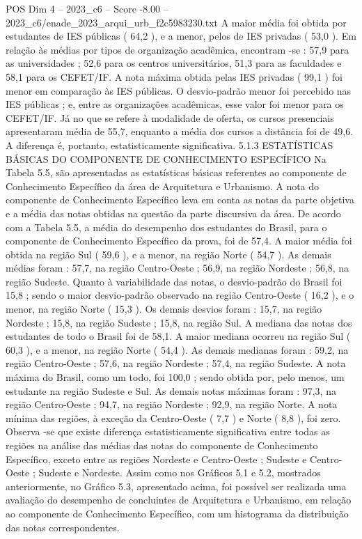 \begin{textsample}{POS Dim 4 – 2023\_c6 – Score -8.00 – 2023\_c6/enade\_2023\_arqui\_urb\_f2c5983230.txt}
A maior média foi obtida por estudantes de IES públicas ( 64,2 ), e a menor, pelos de IES privadas ( 53,0 ).
Em relação às médias por tipos de organização acadêmica, encontram -se : 57,9 para as universidades ; 52,6 para os centros universitários, 51,3 para as faculdades e 58,1 para os CEFET/IF.
A nota máxima obtida pelas IES privadas ( 99,1 ) foi menor em comparação às IES públicas.
O desvio-padrão menor foi percebido nas IES públicas ; e, entre as organizações acadêmicas, esse valor foi menor para os CEFET/IF.
Já no que se refere à modalidade de oferta, os cursos presenciais apresentaram média de 55,7, enquanto a média dos cursos a distância foi de 49,6.
A diferença é, portanto, estatisticamente significativa. 5.1.3 ESTATÍSTICAS BÁSICAS DO COMPONENTE DE CONHECIMENTO ESPECÍFICO Na Tabela 5.5, são apresentadas as estatísticas básicas referentes ao componente de Conhecimento Específico da área de Arquitetura e Urbanismo.
A nota do componente de Conhecimento Específico leva em conta as notas da parte objetiva e a média das notas obtidas na questão da parte discursiva da área.
De acordo com a Tabela 5.5, a média do desempenho dos estudantes do Brasil, para o componente de Conhecimento Específico da prova, foi de 57,4.
A maior média foi obtida na região Sul ( 59,6 ), e a menor, na região Norte ( 54,7 ).
As demais médias foram : 57,7, na região Centro-Oeste ; 56,9, na região Nordeste ; 56,8, na região Sudeste.
Quanto à variabilidade das notas, o desvio-padrão do Brasil foi 15,8 ; sendo o maior desvio-padrão observado na região Centro-Oeste ( 16,2 ), e o menor, na região Norte ( 15,3 ).
Os demais desvios foram : 15,7, na região Nordeste ; 15,8, na região Sudeste ; 15,8, na região Sul.
A mediana das notas dos estudantes de todo o Brasil foi de 58,1.
A maior mediana ocorreu na região Sul ( 60,3 ), e a menor, na região Norte ( 54,4 ).
As demais medianas foram : 59,2, na região Centro-Oeste ; 57,6, na região Nordeste ; 57,4, na região Sudeste.
A nota máxima do Brasil, como um todo, foi 100,0 ; sendo obtida por, pelo menos, um estudante na região Sudeste e Sul.
As demais notas máximas foram : 97,3, na região Centro-Oeste ; 94,7, na região Nordeste ; 92,9, na região Norte.
A nota mínima das regiões, à exceção da Centro-Oeste ( 7,7 ) e Norte ( 8,8 ), foi zero.
Observa -se que existe diferença estatisticamente significativa entre todas as regiões na análise das médias das notas do componente de Conhecimento Específico, exceto entre as regiões Nordeste e Centro-Oeste ; Sudeste e Centro-Oeste ; Sudeste e Nordeste.
Assim como nos Gráficos 5.1 e 5.2, mostrados anteriormente, no Gráfico 5.3, apresentado acima, foi possível ser realizada uma avaliação do desempenho de concluintes de Arquitetura e Urbanismo, em relação ao componente de Conhecimento Específico, com um histograma da distribuição das notas correspondentes.

\end{textsample}

